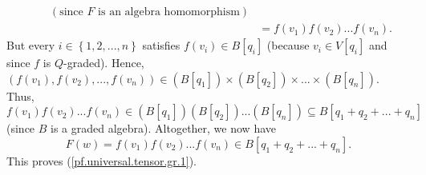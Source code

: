 \documentclass[etingof-lie.tex]{subfiles}
\begin{document}
\begin{verlong}
\begin{align*}
\ \ \ \ \ \ \ \ \ \ \left(  \text{since }F\text{ is an algebra homomorphism}%
\right) \\
&  =f\left(  v_{1}\right)  f\left(  v_{2}\right)  ...f\left(  v_{n}\right)  .
\end{align*}
But every $i\in\left\{  1,2,...,n\right\}  $ satisfies $f\left(  v_{i}\right)
\in B\left[  q_{i}\right]  $ (because $v_{i}\in V\left[  q_{i}\right]  $ and
since $f$ is $Q$-graded). Hence, $\left(  f\left(  v_{1}\right)  ,f\left(
v_{2}\right)  ,...,f\left(  v_{n}\right)  \right)  \in\left(  B\left[
q_{1}\right]  \right)  \times\left(  B\left[  q_{2}\right]  \right)
\times...\times\left(  B\left[  q_{n}\right]  \right)  $. Thus,
\[
f\left(  v_{1}\right)  f\left(  v_{2}\right)  ...f\left(  v_{n}\right)
\in\left(  B\left[  q_{1}\right]  \right)  \left(  B\left[  q_{2}\right]
\right)  ...\left(  B\left[  q_{n}\right]  \right)  \subseteq B\left[
q_{1}+q_{2}+...+q_{n}\right]
\]
(since $B$ is a graded algebra). Altogether, we now have%
\[
F\left(  w\right)  =f\left(  v_{1}\right)  f\left(  v_{2}\right)  ...f\left(
v_{n}\right)  \in B\left[  q_{1}+q_{2}+...+q_{n}\right]  .
\]
This proves (\ref{pf.universal.tensor.gr.1}).


\end{verlong}
\end{document}
